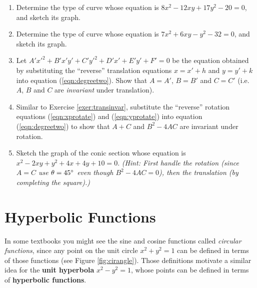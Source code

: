 {\begin{enumerate}[\bfseries 1.]
  \emph{(Hint: Use equations (\ref{eqn:xrotate}) and (\ref{eqn:yrotate}).)}
[{[\bfseries 1.]}]
 \item Determine the type of curve whose equation is $8x^2-12xy+17y^2-20=0$,
  and sketch its graph.
 \item Determine the type of curve whose equation is $7x^2+6xy-y^2-32=0$,
  and sketch its graph.
 \item\label{exer:transinvar} Let $A'x'^2+B'x'y'+C'y'^2+D'x'+E'y'+F'=0$ be the
  equation obtained by substituting the ``reverse'' translation equations
  $x=x'+h$ and $y=y'+k$ into equation (\ref{eqn:degreetwo}). Show that
  $A=A'$, $B=B'$ and $C=C'$ (i.e. $A$, $B$ and $C$ are \emph{invariant} under
  translation).
 \item Similar to Exercise \ref{exer:transinvar}, substitute the ``reverse''
  rotation equations (\ref{eqn:xprotate}) and (\ref{eqn:yprotate}) into equation
  (\ref{eqn:degreetwo}) to show that $A+C$ and $B^2-4AC$ are invariant under
  rotation.
 \item Sketch the graph of the conic section whose equation is
  $x^2-2xy+y^2+4x+4y+10=0$. \emph{(Hint: First handle the rotation (since $A=C$
  use $\theta=45^\circ$ even though $B^2-4AC=0$), then the translation (by
  completing the square).)}
\end{enumerate}
}
\newpage
\section{Hyperbolic Functions}\label{sec:hyperbolic-functions}
In some textbooks you might see the sine and cosine functions called
\emph{circular functions},
since any point on the unit circle $x^2+y^2=1$ can be defined in terms of those
functions (see Figure \ref{fig:cirangle}). Those definitions motivate a similar
idea for the \textbf{unit hyperbola} $x^2-y^2=1$, whose
points can be defined in terms of \textbf{hyperbolic
functions}.

